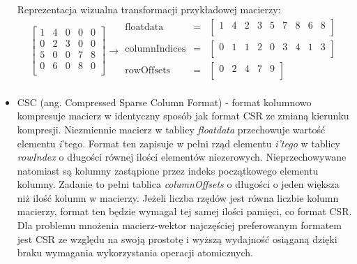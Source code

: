 \begin{itemize}
    Reprezentacja wizualna transformacji przykładowej macierzy:
    \[
\left[
\begin{array}{ccccc}
    1 & 4 & 0 & 0 & 0\\ 
    0 & 2 & 3 & 0 & 0\\ 
    5 & 0 & 0 & 7 & 8\\ 
    0 & 6 & 0 & 8 & 0\\ 
\end{array}
\right]
\rightarrow
\begin{matrix}
\text{floatdata} & = & \begin{bmatrix}
1 & 4 & 2 & 3 & 5 & 7 & 8 & 6 & 8 \\
\end{bmatrix} \\
\text{columnIndices} & = & \begin{bmatrix}
0 & 1 & 1 & 2 & 0 & 3 & 4 & 1 & 3 \\
\end{bmatrix} \\
\text{rowOffsets} & = & \begin{bmatrix}
0 & 2 & 4 & 7 & 9 \\
\end{bmatrix} \\
\end{matrix}
\]

    \item CSC (ang. Compressed Sparse Column Format) - format kolumnowo kompresuje macierz w identyczny sposób jak format CSR ze zmianą kierunku kompresji.
    Niezmiennie macierz w tablicy \textit{floatdata} przechowuje wartość elementu \textit{i}'tego.
    Format ten zapisuje w pełni rząd elementu \textit{i'tego} w tablicy \textit{rowIndex} o długości równej ilości elementów niezerowych.
    Nieprzechowywane natomiast są kolumny zastąpione przez indeks początkowego elementu kolumny.
    Zadanie to pełni tablica \textit{columnOffsets} o długości o jeden większa niż ilość kolumn w macierzy.
    Jeżeli liczba rzędów jest równa liczbie kolumn macierzy, format ten będzie wymagał tej samej ilości pamięci, co format CSR.
    Dla problemu mnożenia macierz-wektor najczęściej preferowanym formatem jest CSR ze względu na swoją prostotę i wyższą wydajność osiąganą dzięki braku wymagania wykorzystania operacji atomicznych.
    

\end{itemize}
